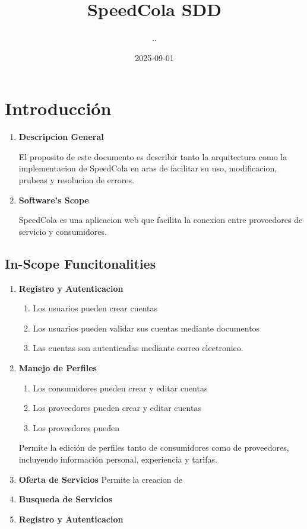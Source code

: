 \documentclass{article}
\title{SpeedCola SDD}
\date{2025-09-01}
\author{..}
\begin{document}
\maketitle
\newpage
{}

\section{Introducci\'on}
  \begin{enumerate}
    \item  \textbf{Descripcion General}

  El proposito de este documento es describir tanto la arquitectura como la implementacion de 
  SpeedCola en aras de facilitar su uso, modificacion, prubeas y resolucion de errores.

  \item \textbf{Software's Scope}

  SpeedCola es una aplicacion web que facilita la conexion entre proveedores de servicio y consumidores.

  \end{enumerate}

  \subsection{In-Scope Funcitonalities}
    \begin{enumerate}
      \item \textbf{Registro y Autenticacion}
        \begin{enumerate}
          \item Los usuarios pueden crear cuentas
          \item Los usuarios pueden validar sus cuentas mediante documentos
          \item Las cuentas son autenticadas mediante correo electronico.
        \end{enumerate}
      \item \textbf{Manejo de Perfiles}
        \begin{enumerate}
          \item Los consumidores pueden crear y editar cuentas
          \item Los proveedores pueden crear  y editar cuentas
          \item Los proveedores pueden 
        \end{enumerate}
      Permite la edición de perfiles tanto de consumidores como de 
      proveedores, incluyendo información personal, experiencia y tarifas.  
      \item \textbf{Oferta de Servicios}
        Permite la creacion de 
      \item \textbf{Busqueda de Servicios}
      \item \textbf{Registro y Autenticacion}
    \end{enumerate}
\end{document}
